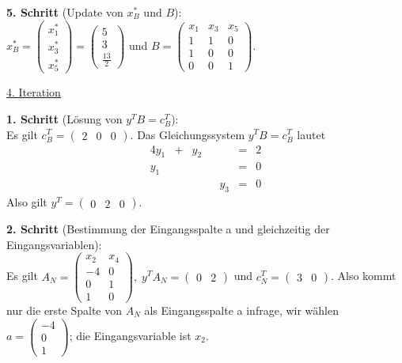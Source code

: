 \documentclass[10pt,a4paper,oneside,ngerman,numbers=noenddot]{scrartcl}
\begin{document}
		\textbf{5. Schritt} (Update von $x_{B}^{*}$ und $B$):\\
		$x_{B}^{*} = \begin{pmatrix} x_{1}^{*} \\ x_{3}^{*} \\ x_{5}^{*} \end{pmatrix} = \begin{pmatrix} 5 \\ 3 \\ \frac{13}{2} \end{pmatrix}$ und $B = \begin{pmatrix} x_{1} & x_{3} & x_{5} \\ 1 & 1 & 0 \\ 1 & 0 & 0 \\ 0 & 0 & 1 \end{pmatrix}$.
		
		\underline{4. Iteration}
		
		\textbf{1. Schritt} (Lösung von $y^{T}B = c_{B}^{T}$):\\
		Es gilt $c_{B}^{T} = \begin{pmatrix} 2 & 0 & 0 \end{pmatrix}$. Das Gleichungssystem $y^{T}B = c_{B}^{T}$ lautet
		\begin{alignat*}{4}
			y_{1} &+& y_{2} && &=& 2 \\
			y_{1} && && &=& 0 \\
			&& && y_{3} &=& 0
		\end{alignat*}
		Also gilt $y^{T} = \begin{pmatrix} 0 & 2 & 0 \end{pmatrix}$.
		
		\textbf{2. Schritt} (Bestimmung der Eingangsspalte a und gleichzeitig der Eingangsvariablen):\\
		Es gilt $A_{N} = \begin{pmatrix} x_{2} & x_{4} \\ -4 & 0 \\ 0 & 1 \\ 1 & 0 \end{pmatrix},\; y^{T}A_{N} = \begin{pmatrix} 0 & 2 \end{pmatrix}$ und $c_{N}^{T} = \begin{pmatrix} 3 & 0 \end{pmatrix}$. Also kommt nur die erste Spalte von $A_{N}$ als Eingangsspalte a infrage, wir wählen $a = \begin{pmatrix} -4 \\ 0 \\ 1 \end{pmatrix}$; die Eingangsvariable ist $x_{2}$.
		
\end{document}
